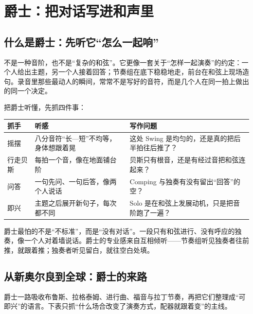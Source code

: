 \chapter{爵士：把对话写进和声里}
\label{ch:genre-jazz-deep}


\section{什么是爵士：先听它“怎么一起响”}
\label{sec:jazz-what}

不是一种音阶，也不是“复杂的和弦”。它更像一套关于“怎样一起演奏”的约定：一个人给出主题，另一个人接着回答；节奏组在底下稳稳地走，前台在和弦上现场造句。录音里那些最动人的瞬间，常常不是写好的音符，而是几个人在同一拍上做出的同一个决定。

把爵士听懂，先抓四件事：

\begin{longtable}{p{}p{}p{}}
\toprule
抓手 & 听感 & 写作问题 \\
\midrule
摇摆 & 八分音符“长—短”不均等，身体想跟着晃 & 这处 Swing 是均匀的，还是真的把后半拍往后推了？ \\
行走贝斯 & 每拍一个音，像在地面铺台阶 & 贝斯只有根音，还是有经过音把和弦连起来？ \\
问答 & 一句先问、一句后答，像两个人说话 & Comping 与独奏有没有留出“回答”的空？ \\
即兴 & 主题之后展开新句子，每次都不同 & Solo 是在和弦上发展动机，只是把音阶跑了一遍？ \\
\bottomrule
\end{longtable}

爵士最怕的不是“不标准”，而是“没有对话”。一段只有和弦进行、没有呼应的独奏，像一个人对着墙说话。爵士的专业感来自互相倾听——节奏组听见独奏者往前推，就跟着推；独奏者听见留白，就往空白处填。

\section{从新奥尔良到全球：爵士的来路}
\label{sec:jazz-history}

爵士一路吸收布鲁斯、拉格泰姆、进行曲、福音与拉丁节奏，再把它们整理成“可即兴”的语言。下表只抓“什么场合改变了演奏方式，配器就跟着变”的主线。

